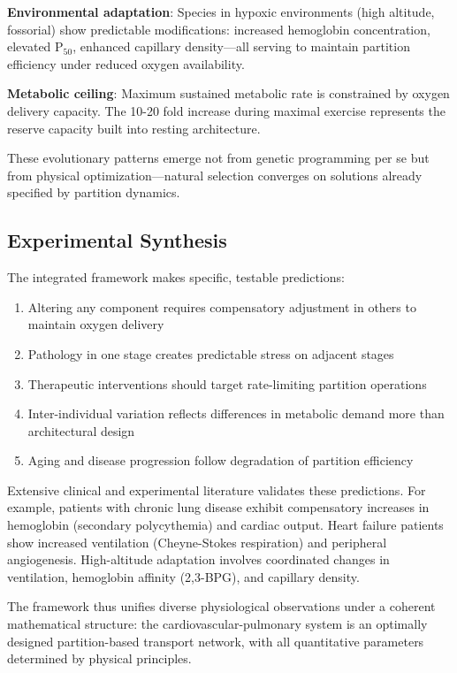 \documentclass[12pt,a4paper]{article}
\theoremstyle{remark}
\begin{document}
\textbf{Environmental adaptation}: Species in hypoxic environments (high altitude, fossorial) show predictable modifications: increased hemoglobin concentration, elevated P$_{50}$, enhanced capillary density—all serving to maintain partition efficiency under reduced oxygen availability.

\textbf{Metabolic ceiling}: Maximum sustained metabolic rate is constrained by oxygen delivery capacity. The 10-20 fold increase during maximal exercise represents the reserve capacity built into resting architecture.

These evolutionary patterns emerge not from genetic programming per se but from physical optimization—natural selection converges on solutions already specified by partition dynamics.

\subsection{Experimental Synthesis}

The integrated framework makes specific, testable predictions:

\begin{enumerate}
\item Altering any component requires compensatory adjustment in others to maintain oxygen delivery
\item Pathology in one stage creates predictable stress on adjacent stages
\item Therapeutic interventions should target rate-limiting partition operations
\item Inter-individual variation reflects differences in metabolic demand more than architectural design
\item Aging and disease progression follow degradation of partition efficiency
\end{enumerate}

Extensive clinical and experimental literature validates these predictions. For example, patients with chronic lung disease exhibit compensatory increases in hemoglobin (secondary polycythemia) and cardiac output. Heart failure patients show increased ventilation (Cheyne-Stokes respiration) and peripheral angiogenesis. High-altitude adaptation involves coordinated changes in ventilation, hemoglobin affinity (2,3-BPG), and capillary density.

The framework thus unifies diverse physiological observations under a coherent mathematical structure: the cardiovascular-pulmonary system is an optimally designed partition-based transport network, with all quantitative parameters determined by physical principles.
\end{document}
